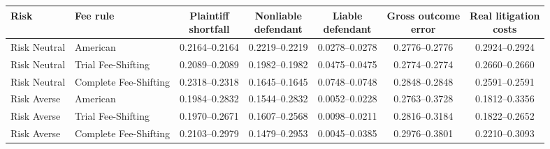 \documentclass[10pt,border=5pt]{standalone}
\begin{document}
\begin{tabular}{llccccc}
\toprule Risk & Fee rule & \shortstack{Plaintiff\\shortfall} & \shortstack{Nonliable\\defendant} & \shortstack{Liable\\defendant} & \shortstack{Gross outcome\\error} & \shortstack{Real litigation\\costs} \\
\midrule
Risk Neutral & American & 0.2164--0.2164 & 0.2219--0.2219 & 0.0278--0.0278 & 0.2776--0.2776 & 0.2924--0.2924 \\
Risk Neutral & Trial Fee-Shifting & 0.2089--0.2089 & 0.1982--0.1982 & 0.0475--0.0475 & 0.2774--0.2774 & 0.2660--0.2660 \\
Risk Neutral & Complete Fee-Shifting & 0.2318--0.2318 & 0.1645--0.1645 & 0.0748--0.0748 & 0.2848--0.2848 & 0.2591--0.2591 \\
Risk Averse & American & 0.1984--0.2832 & 0.1544--0.2832 & 0.0052--0.0228 & 0.2763--0.3728 & 0.1812--0.3356 \\
Risk Averse & Trial Fee-Shifting & 0.1970--0.2671 & 0.1607--0.2568 & 0.0098--0.0211 & 0.2816--0.3184 & 0.1822--0.2652 \\
Risk Averse & Complete Fee-Shifting & 0.2103--0.2979 & 0.1479--0.2953 & 0.0045--0.0385 & 0.2976--0.3801 & 0.2210--0.3093 \\
\bottomrule\end{tabular}
\end{document}
